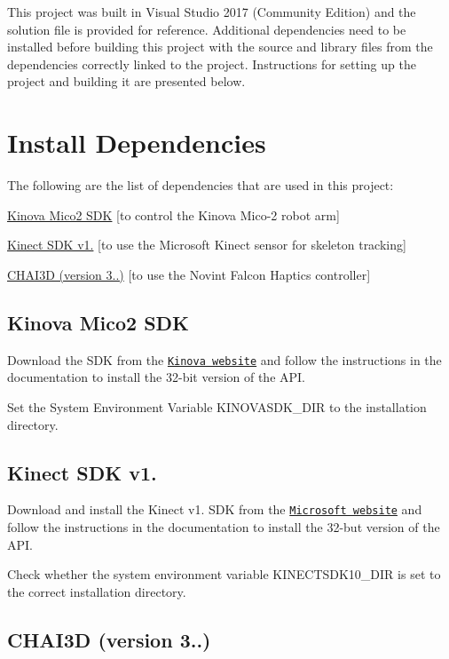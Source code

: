 This project was built in Visual Studio 2017 (Community Edition) and the solution file is provided for reference. Additional dependencies need to be installed before building this project with the source and library files from the dependencies correctly linked to the project. Instructions for setting up the project and building it are presented below.\hypertarget{install_install_dependencies}{}\section{Install Dependencies}\label{install_install_dependencies}
The following are the list of dependencies that are used in this project\+:
\begin{DoxyItemize}
\item \hyperlink{install_kinova_sdk}{Kinova Mico2 S\+DK} \mbox{[}to control the Kinova Mico-\/2 robot arm\mbox{]}
\item \hyperlink{install_kinect_sdk}{Kinect S\+DK v1.} \mbox{[}to use the Microsoft Kinect sensor for skeleton tracking\mbox{]}
\item \hyperlink{install_chai3d_sdk}{C\+H\+A\+I3D (version 3..)} \mbox{[}to use the Novint Falcon Haptics controller\mbox{]}
\end{DoxyItemize}\hypertarget{install_kinova_sdk}{}\subsection{Kinova Mico2 S\+DK}\label{install_kinova_sdk}

\begin{DoxyEnumerate}
\item Download the S\+DK from the \href{https://www.kinovarobotics.com/en/knowledge-hub/all-kinova-products}{\tt Kinova website} and follow the instructions in the documentation to install the 32-\/bit version of the A\+PI.
\item Set the System Environment Variable K\+I\+N\+O\+V\+A\+S\+D\+K\+\_\+\+D\+IR to the installation directory.
\end{DoxyEnumerate}\hypertarget{install_kinect_sdk}{}\subsection{Kinect S\+D\+K v1.}\label{install_kinect_sdk}

\begin{DoxyEnumerate}
\item Download and install the Kinect v1. S\+DK from the \href{https://www.microsoft.com/en-us/download/details.aspx?id=40278}{\tt Microsoft website} and follow the instructions in the documentation to install the 32-\/but version of the A\+PI.
\item Check whether the system environment variable K\+I\+N\+E\+C\+T\+S\+D\+K10\+\_\+\+D\+IR is set to the correct installation directory.
\end{DoxyEnumerate}\hypertarget{install_chai3d_sdk}{}\subsection{C\+H\+A\+I3\+D (version 3..)}\label{install_chai3d_sdk}


